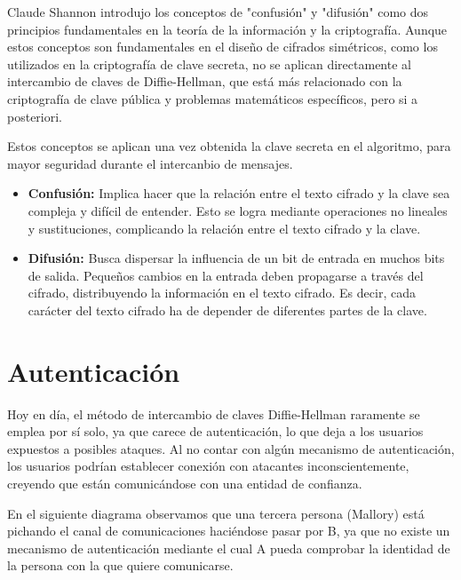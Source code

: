 \documentclass[11pt]{article}
\begin{document}
Claude Shannon introdujo los conceptos de "confusión" y "difusión" como dos principios fundamentales en la teoría de la información y la criptografía. Aunque estos conceptos son fundamentales en el diseño de cifrados simétricos, como los utilizados en la criptografía de clave secreta, no se aplican directamente al intercambio de claves de Diffie-Hellman, que está más relacionado con la criptografía de clave pública y problemas matemáticos específicos, pero si a posteriori.

Estos conceptos se aplican una vez obtenida la clave secreta en el algoritmo, para mayor seguridad durante el intercanbio de mensajes.

\begin{itemize}
	\item \textbf{Confusión:} Implica hacer que la relación entre el texto cifrado y la clave sea compleja y difícil de entender. Esto se logra mediante operaciones no lineales y sustituciones, complicando la relación entre el texto cifrado y la clave.

	\item \textbf{Difusión:} Busca dispersar la influencia de un bit de entrada en muchos bits de salida. Pequeños cambios en la entrada deben propagarse a través del cifrado, distribuyendo la información en el texto cifrado. Es decir, cada carácter del texto cifrado ha de depender de diferentes partes de la clave.
\end{itemize}



\section{Autenticación}

Hoy en día, el método de intercambio de claves Diffie-Hellman raramente se emplea por sí solo, ya que carece de autenticación, lo que deja a los usuarios expuestos a posibles ataques. Al no contar con algún mecanismo de autenticación, los usuarios podrían establecer conexión con atacantes inconscientemente, creyendo que están comunicándose con una entidad de confianza.

\newpage

En el siguiente diagrama observamos que una tercera persona (Mallory) está pichando el canal de comunicaciones haciéndose pasar por B, ya que no existe un mecanismo de autenticación mediante el cual A pueda comprobar la identidad de la persona con la que quiere comunicarse.
\end{document}
